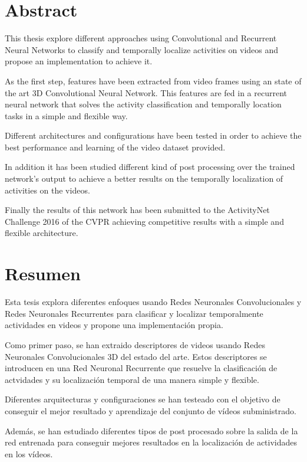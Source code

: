 \chapter*{Abstract}

This thesis explore different approaches using Convolutional and Recurrent Neural Networks to classify and temporally localize activities on videos and propose an implementation to achieve it.

As the first step, features have been extracted from video frames using an state of the art 3D Convolutional Neural Network. This features are fed in a recurrent neural network that solves the activity classification and temporally location tasks in a simple and flexible way.

Different architectures and configurations have been tested in order to achieve the best performance and learning of the video dataset provided.

In addition it has been studied different kind of post processing over the trained network's output to achieve a better results on the temporally localization of activities on the videos.

Finally the results of this network has been submitted to the ActivityNet Challenge 2016 of the CVPR achieving competitive results with a simple and flexible architecture.

\chapter*{Resumen}

Esta tesis explora diferentes enfoques usando Redes Neuronales Convolucionales y Redes Neuronales Recurrentes para clasificar y localizar temporalmente actividades en videos y propone una implementación propia.

Como primer paso, se han extraido descriptores de videos usando Redes Neuronales Convolucionales 3D del estado del arte. Estos descriptores se introducen en una Red Neuronal Recurrente que resuelve la clasificación de actvidades y su localización temporal de una manera simple y flexible.

Diferentes arquitecturas y configuraciones se han testeado con el objetivo de conseguir el mejor resultado y aprendizaje del conjunto de vídeos subministrado.

Además, se han estudiado diferentes tipos de post procesado sobre la salida de la red entrenada para conseguir mejores resultados en la localización de actividades en los vídeos.

